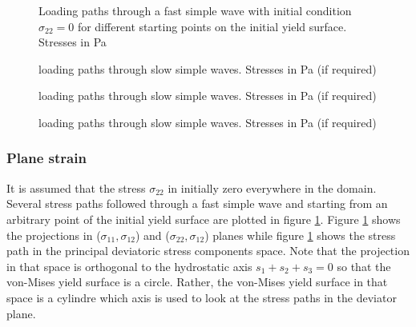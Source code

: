 \begin{figure}[h!]
  \centering
  \caption{Loading paths through a fast simple wave with initial condition $\sigma_{22}=0$ for different starting points on the initial yield surface. Stresses in Pa}
  \label{fig:fast_path_plane_strains}
\end{figure}


\begin{figure}[h!]
  \centering
  \caption{loading paths through slow simple waves. Stresses in Pa (if required)}
  \label{fig:slow_path_plane_strains}
\end{figure}

\begin{figure}[h!]
  \centering
  \caption{loading paths through slow simple waves. Stresses in Pa (if required)}
  \label{fig:slow_path_plane_strains}
\end{figure}


\begin{figure}[h!]
  \centering
  \caption{loading paths through slow simple waves. Stresses in Pa (if required)}
  \label{fig:slow_path_plane_strains}
\end{figure}



\subsubsection*{Plane strain}
It is assumed that the stress $\sigma_{22}$ in initially zero everywhere in the domain. Several stress paths followed through a fast simple wave and starting from an arbitrary point of the initial yield surface are plotted in figure \ref{fig:fast_path_plane_strains}. Figure \ref{fig:fast_path_plane_strains} shows the projections in ($\sigma_{11},\sigma_{12}$) and ($\sigma_{22},\sigma_{12}$) planes while figure \ref{fig:fast_path_plane_strains} shows the stress path in the principal deviatoric stress components space. Note that the projection in that space is orthogonal to the hydrostatic axis $s_1+s_2+s_3=0$ so that the von-Mises yield surface is a circle. Rather, the von-Mises yield surface in that space is a cylindre which axis is used to look at the stress paths in the deviator plane.

